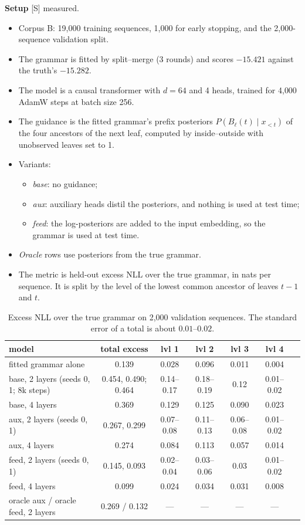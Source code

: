 \documentclass[11pt]{article}
\theoremstyle{definition}
\theoremstyle{remark}
\newcommand{\src}[1]{\textsf{\small[#1]}}
\newcommand{\st}[1]{\textsf{\small\color{gray}#1}}
\begin{document}
\textbf{Setup} \src{S} \st{measured}.
\begin{itemize}
  \item Corpus B: 19{,}000 training sequences, 1{,}000 for early stopping, and the 2{,}000-sequence validation split.
  \item The grammar is fitted by split--merge (3 rounds) and scores $-15.421$ against the truth's $-15.282$.
  \item The model is a causal transformer with $d=64$ and 4 heads, trained for 4{,}000 AdamW steps at batch size 256.
  \item The guidance is the fitted grammar's prefix posteriors $P(B_\ell(t)\mid x_{<t})$ of the four ancestors of the next leaf, computed by inside--outside with unobserved leaves set to 1.
  \item Variants:
  \begin{itemize}
    \item \emph{base}: no guidance;
    \item \emph{aux}: auxiliary heads distil the posteriors, and nothing is used at test time;
    \item \emph{feed}: the log-posteriors are added to the input embedding, so the grammar is used at test time.
  \end{itemize}
  \item \emph{Oracle} rows use posteriors from the true grammar.
  \item The metric is held-out excess NLL over the true grammar, in nats per sequence. It is split by the level of the lowest common ancestor of leaves $t-1$ and $t$.
\end{itemize}
\begin{table}[h]\centering\small
\begin{tabular}{lcccccc}
\toprule
model & total excess & lvl 1 & lvl 2 & lvl 3 & lvl 4\\
\midrule
fitted grammar alone & 0.139 & 0.028 & 0.096 & 0.011 & 0.004\\
base, 2 layers (seeds 0, 1; 8k steps) & 0.454, 0.490; 0.464 & 0.14--0.17 & 0.18--0.19 & 0.12 & 0.01--0.02\\
base, 4 layers & 0.369 & 0.129 & 0.125 & 0.090 & 0.023\\
aux, 2 layers (seeds 0, 1) & 0.267, 0.299 & 0.07--0.08 & 0.11--0.13 & 0.06--0.08 & 0.01--0.02\\
aux, 4 layers & 0.274 & 0.084 & 0.113 & 0.057 & 0.014\\
feed, 2 layers (seeds 0, 1) & 0.145, 0.093 & 0.02--0.04 & 0.03--0.06 & 0.03 & 0.01--0.02\\
feed, 4 layers & 0.099 & 0.024 & 0.034 & 0.031 & 0.008\\
oracle aux / oracle feed, 2 layers & 0.269 / 0.132 & --- & --- & --- & ---\\
\bottomrule
\end{tabular}
\caption{Excess NLL over the true grammar on 2{,}000 validation sequences. The standard error of a total is about $0.01$--$0.02$.}
\end{table}
\end{document}
